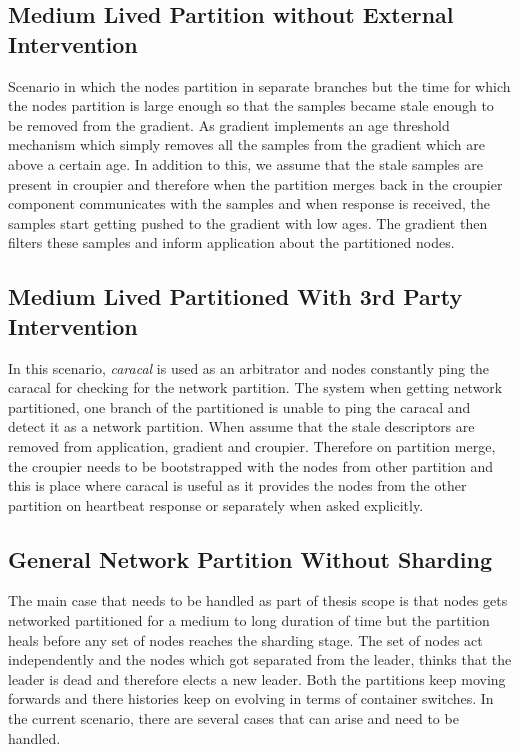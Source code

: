 \documentclass[a4paper, 11pt]{article}
\begin{document}
\subsection{Medium Lived Partition without External Intervention}
Scenario in which the nodes partition in separate branches but the time for which the nodes partition is large enough so that the samples became stale enough to be removed from the gradient. As gradient implements an age threshold mechanism which simply removes all the samples from the gradient which are above a certain age. In addition to this, we assume that the stale samples are present in croupier and therefore when the partition merges back in the croupier component communicates with the samples and when response is received, the samples start getting pushed to the gradient with low ages. The gradient then filters these samples and inform application about the partitioned nodes.

\subsection{Medium Lived Partitioned With 3rd Party Intervention}
In this scenario, \textit{caracal} is used as an arbitrator and nodes constantly ping the caracal for checking for the network partition. The system when getting network partitioned, one branch of the partitioned is unable to ping the caracal and detect it as a network partition. When assume that the stale descriptors are removed from application, gradient and croupier. Therefore on partition merge, the croupier needs to be bootstrapped with the nodes from other partition and this is place where caracal is useful as it provides the nodes from the other partition on heartbeat response or separately when asked explicitly.



\subsection{General Network Partition Without Sharding}
The main case that needs to be handled as part of thesis scope is that nodes gets networked partitioned for a medium to long duration of time but the partition heals before any set of nodes reaches the sharding stage. The set of nodes act independently and the nodes which got separated from the leader, thinks that the leader is dead and therefore elects a new leader. Both the partitions keep moving forwards and there histories keep on evolving in terms of container switches. In the current scenario, there are several cases that can arise and need to be handled.\\
\end{document}
